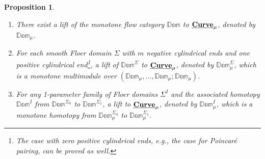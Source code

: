 \documentclass[reqno, 10pt]{amsart}
\numberwithin{equation}{section}
\numberwithin{equation}{section}
\newtheorem{prop}[thm]{Proposition}
\theoremstyle{definition}
\theoremstyle{remark}
\newcommand{\mb}{\mathbb}
\newcommand{\uds}[1]{\underline{\smash{#1}}}
\begin{document}
\begin{prop}\label{system_representation}
\hfill
\begin{enumerate}

\item There exist a lift of the monotone flow category $\mb{Dom}$ to $\uds{\bf Curve}_\mu$, denoted by $\mb{Dom}_\mu$.

\item For each smooth Floer domain $\Sigma$ with $m$ negative cylindrical ends and one positive cylindrical end\footnote{The case with zero positive cylindrical ends, e.g., the case for Poincar\'e pairing, can be proved as well.}, a lift of $\mb{Dom}^\Sigma$ to $\uds{\bf Curve}_\mu$, denoted by $\mb{Dom}^\Sigma_\mu$, which is a monotone  multimodule over $(\mb{Dom}_\mu, \ldots, \mb{Dom}_\mu; \mb{Dom}_\mu)$.

\item For any 1-parameter family of Floer domains $\Sigma^I$ and the associated homotopy $\mb{Dom}^I$ from $\mb{Dom}^{\Sigma_0}$ to $\mb{Dom}^{\Sigma_1}$, a lift to $\uds{\bf Curve}_\mu$, denoted by $\mb{Dom}_\mu^I$, which is a monotone homotopy from $\mb{Dom}_\mu^{\Sigma_0}$ to $\mb{Dom}_\mu^{\Sigma_1}$.
\end{enumerate}
\end{prop}
\end{document}
